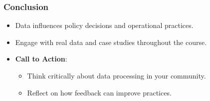\documentclass[aspectratio=169]{beamer}
\begin{document}
\begin{frame}[fragile]
    \frametitle{Conclusion}
    \begin{itemize}
        \item Data influences policy decisions and operational practices.
        \item Engage with real data and case studies throughout the course.
        \item \textbf{Call to Action}:
        \begin{itemize}
            \item Think critically about data processing in your community.
            \item Reflect on how feedback can improve practices.
        \end{itemize}
    \end{itemize}
\end{frame}
\end{document}
